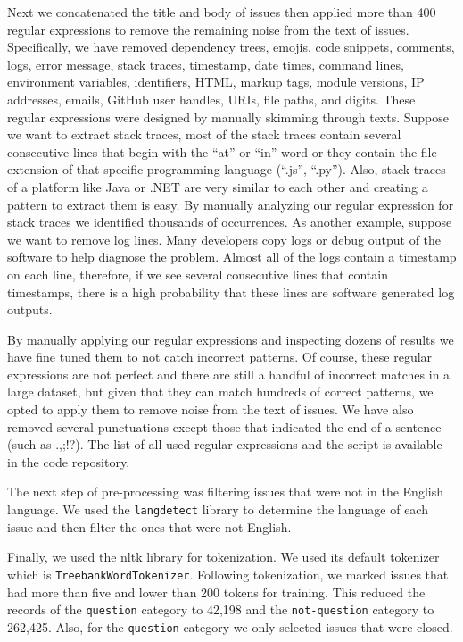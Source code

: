 \documentclass[conference]{IEEEtran}
\begin{document}
Next we concatenated the title and body of issues then applied more than 400 regular expressions 
to remove the remaining noise from the text of issues. Specifically,
we have removed dependency trees, emojis, code snippets, comments, logs,
error message, stack traces, timestamp, date times, command lines, environment variables, identifiers,
HTML, markup tags, module versions, IP addresses, emails, GitHub user handles, URIs, file paths, and digits.
These regular expressions were designed by manually skimming through texts. Suppose we want to extract
stack traces, most of the stack traces contain several consecutive lines that begin with 
the ``at'' or ``in'' word or they contain the file extension of that specific 
programming language (``.js'', ``.py''). Also, stack traces of a platform like Java or .NET are 
very similar to each other and creating a pattern to extract them is easy.
By manually analyzing our regular expression for stack traces we identified thousands
of occurrences. As another example, suppose we want to remove log lines. Many developers copy logs or debug
output of the software to help diagnose the problem. Almost all of the logs contain a timestamp on
each line, therefore, if we see several consecutive lines that contain timestamps, there is 
a high probability that these lines are software generated log outputs.

By manually applying our regular expressions and inspecting dozens of results we have fine tuned 
them to not catch incorrect patterns. Of course, these regular expressions are not perfect and there are 
still a handful of incorrect matches in a large dataset, but given that they can match hundreds of correct patterns, 
we opted to apply them to remove noise from the text of issues. We have also removed several punctuations except 
those that indicated the end of a sentence (such as .,;!?). The list of all used regular expressions 
and the script is available in the code repository.

The next step of pre-processing was filtering issues that were not in the English language. We used 
the \verb|langdetect| \cite{web:langdetect} library to determine the language of each issue 
and then filter the ones that were not English.

Finally, we used the nltk library for tokenization. We used its default tokenizer
which is \verb|TreebankWordTokenizer|. Following 
tokenization, we marked issues that had more than five and lower than 200 tokens for training. 
This reduced the records of the \verb|question| category 
to 42,198 and the \verb|not-question| category to 262,425. Also, for the \verb|question| category we only selected
issues that were closed. 
\end{document}
